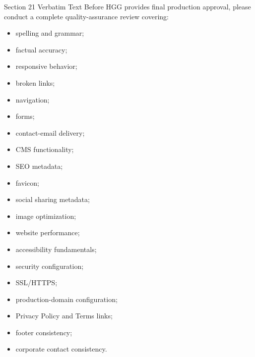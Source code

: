 \documentclass[11pt,a4paper]{article}
\begin{document}
\begin{VerbatimClientBox}{Section 21 Verbatim Text}
Before HGG provides final production approval, please conduct a complete quality-assurance review covering:
\begin{itemize}[noitemsep]
    \item spelling and grammar;
    \item factual accuracy;
    \item responsive behavior;
    \item broken links;
    \item navigation;
    \item forms;
    \item contact-email delivery;
    \item CMS functionality;
    \item SEO metadata;
    \item favicon;
    \item social sharing metadata;
    \item image optimization;
    \item website performance;
    \item accessibility fundamentals;
    \item security configuration;
    \item SSL/HTTPS;
    \item production-domain configuration;
    \item Privacy Policy and Terms links;
    \item footer consistency;
    \item corporate contact consistency.
\end{itemize}
\end{VerbatimClientBox}
\end{document}
